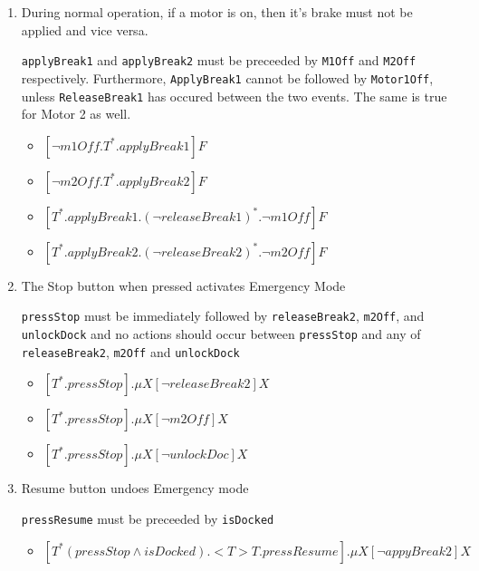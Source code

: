 \documentclass{article}
\begin{document}
\begin{enumerate}
    \item During normal operation, if a motor is on, then it's brake must not be applied and vice versa.
    
    \texttt{applyBreak1} and \texttt{applyBreak2} must be preceeded by \texttt{M1Off} and \texttt{M2Off} respectively. Furthermore, \texttt{ApplyBreak1} cannot be followed by \texttt{Motor1Off}, unless \texttt{ReleaseBreak1} has occured between the two events. The same is true for Motor 2 as well.
    
    \begin{itemize}
        \item [\textendash] $[\neg m1Off.T^{\ast}.applyBreak1]F$
        \item [\textendash] $[\neg m2Off.T^{\ast}.applyBreak2]F$
        \item [\textendash] $[T^{\ast}.applyBreak1.(\neg releaseBreak1)^{\ast}.\neg m1Off]F$
        \item [\textendash] $[T^{\ast}.applyBreak2.(\neg releaseBreak2)^{\ast}.\neg m2Off]F$
    \end{itemize}
    
    \item The Stop button when pressed activates Emergency Mode
    
    \texttt{pressStop} must be immediately followed by \texttt{releaseBreak2}, \texttt{m2Off}, and \texttt{unlockDock} and no actions should occur between \texttt{pressStop} and any of \texttt{releaseBreak2}, \texttt{m2Off} and \texttt{unlockDock}
    
    \begin{itemize}
        \item [\textendash] $[T^{\ast}.pressStop].\mu X[\neg releaseBreak2]X$
        \item [\textendash] $[T^{\ast}.pressStop].\mu X[\neg m2Off]X$
        \item [\textendash] $[T^{\ast}.pressStop].\mu X[\neg unlockDoc]X$
    \end{itemize}
        
    \item Resume button undoes Emergency mode
    
    \texttt{pressResume} must be preceeded by \texttt{isDocked}
    \begin{itemize}
        \item [\textendash] $[T^{\ast}(pressStop \wedge isDocked).<T>T.pressResume].\mu X[\neg appyBreak2]X$
    \end{itemize}


\end{enumerate}
\end{document}
